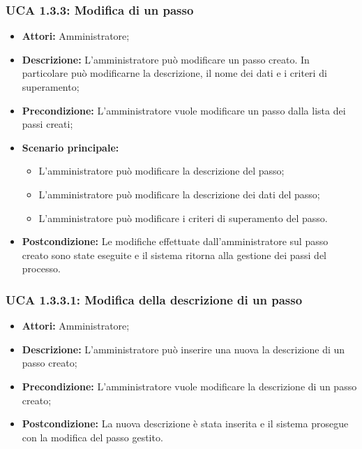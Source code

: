 \subsubsection{UCA 1.3.3: Modifica di un passo}
\begin{itemize}
\item \textbf{Attori:}
 Amministratore;
\item \textbf{Descrizione:} 
L'amministratore può modificare un passo creato. In particolare può modificarne la descrizione, il nome dei dati e i criteri di superamento; 
\item \textbf{Precondizione:}
 L'amministratore vuole modificare un passo dalla lista dei passi creati;
\item \textbf{Scenario principale:} 
\begin{itemize}
\item L'amministratore può modificare la descrizione del passo;
\item L'amministratore può modificare la descrizione dei dati del passo;
\item L'amministratore può modificare i criteri di superamento del passo.
\end{itemize}
\item \textbf{Postcondizione:}
 Le modifiche effettuate dall'amministratore sul passo creato sono state eseguite e il sistema ritorna alla gestione dei passi del processo. 
\end{itemize}

\hypertarget{A1.3.3.1}{}
\subsubsection{UCA 1.3.3.1: Modifica della descrizione di un passo}
\begin{itemize}
\item \textbf{Attori:}
 Amministratore;
\item \textbf{Descrizione:}
 L'amministratore può inserire una nuova la descrizione di un passo creato;
\item \textbf{Precondizione:} 
L'amministratore vuole modificare la descrizione di un passo creato;
\item \textbf{Postcondizione:}
 La nuova descrizione è stata inserita e il sistema prosegue con la modifica del passo gestito.
\end{itemize}

\hypertarget{A1.3.3.2}{}
